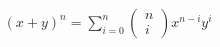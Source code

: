  \begin {align}[] (x+y)^n = \sum _{i=0}^n \left (\begin {matrix}n\\i\end {matrix}\right ) x^{n-i} y^i \end {align} 
